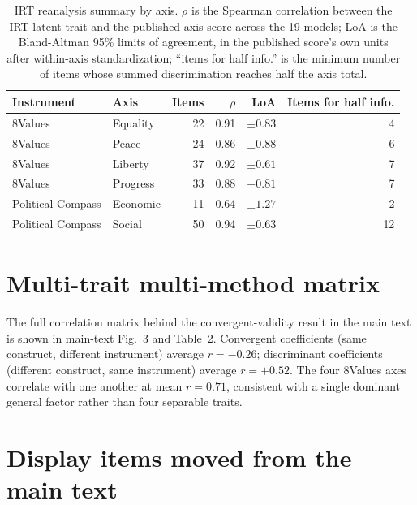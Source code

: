 \documentclass[11pt]{article}
\begin{document}
\begin{table}[H]
\centering
\caption{IRT reanalysis summary by axis. $\rho$ is the Spearman correlation
between the IRT latent trait and the published axis score across the 19
models; LoA is the Bland-Altman 95\% limits of agreement, in the published
score's own units after within-axis standardization; ``items for half
info.'' is the minimum number of items whose summed discrimination reaches
half the axis total.}
\label{stab:irt-summary}
\footnotesize
\begin{tabular}{llrrrr}
\toprule
Instrument & Axis & Items & $\rho$ & LoA & Items for half info. \\
\midrule
8Values & Equality & 22 & 0.91 & $\pm 0.83$ & 4 \\
8Values & Peace & 24 & 0.86 & $\pm 0.88$ & 6 \\
8Values & Liberty & 37 & 0.92 & $\pm 0.61$ & 7 \\
8Values & Progress & 33 & 0.88 & $\pm 0.81$ & 7 \\
Political Compass & Economic & 11 & 0.64 & $\pm 1.27$ & 2 \\
Political Compass & Social & 50 & 0.94 & $\pm 0.63$ & 12 \\
\bottomrule
\end{tabular}
\end{table}

\section{Multi-trait multi-method matrix}

The full correlation matrix behind the convergent-validity result in the main
text is shown in main-text Fig.~3 and Table~2. Convergent coefficients (same
construct, different instrument) average $r=-0.26$; discriminant coefficients
(different construct, same instrument) average $r=+0.52$. The four 8Values axes
correlate with one another at mean $r=0.71$, consistent with a single dominant
general factor rather than four separable traits.



\section{Display items moved from the main text}
\end{document}
